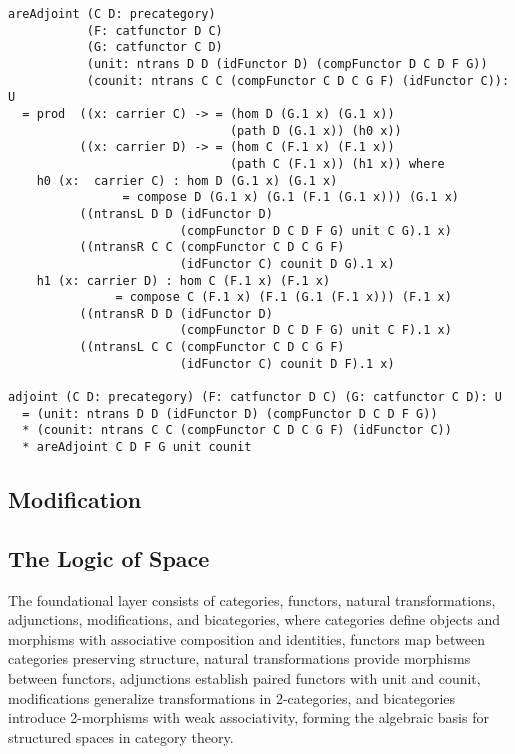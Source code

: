 \documentclass{article}
\begin{document}
\newpage
\begin{lstlisting}
areAdjoint (C D: precategory)
           (F: catfunctor D C)
           (G: catfunctor C D)
           (unit: ntrans D D (idFunctor D) (compFunctor D C D F G))
           (counit: ntrans C C (compFunctor C D C G F) (idFunctor C)): U
  = prod  ((x: carrier C) -> = (hom D (G.1 x) (G.1 x))
                               (path D (G.1 x)) (h0 x))
          ((x: carrier D) -> = (hom C (F.1 x) (F.1 x))
                               (path C (F.1 x)) (h1 x)) where
    h0 (x:  carrier C) : hom D (G.1 x) (G.1 x)
                = compose D (G.1 x) (G.1 (F.1 (G.1 x))) (G.1 x)
          ((ntransL D D (idFunctor D)
                        (compFunctor D C D F G) unit C G).1 x)
          ((ntransR C C (compFunctor C D C G F)
                        (idFunctor C) counit D G).1 x)
    h1 (x: carrier D) : hom C (F.1 x) (F.1 x)
               = compose C (F.1 x) (F.1 (G.1 (F.1 x))) (F.1 x)
          ((ntransR D D (idFunctor D)
                        (compFunctor D C D F G) unit C F).1 x)
          ((ntransL C C (compFunctor C D C G F)
                        (idFunctor C) counit D F).1 x)

adjoint (C D: precategory) (F: catfunctor D C) (G: catfunctor C D): U
  = (unit: ntrans D D (idFunctor D) (compFunctor D C D F G))
  * (counit: ntrans C C (compFunctor C D C G F) (idFunctor C))
  * areAdjoint C D F G unit counit
\end{lstlisting}

\subsection{Modification}

\newpage
\subsection{The Logic of Space}

The foundational layer consists of categories, functors, natural transformations,
adjunctions, modifications, and bicategories, where categories define objects and
morphisms with associative composition and identities, functors map between categories
preserving structure, natural transformations provide morphisms between functors,
adjunctions establish paired functors with unit and counit, modifications generalize
transformations in 2-categories, and bicategories introduce 2-morphisms
with weak associativity, forming the algebraic basis for structured spaces in category theory.
\end{document}
